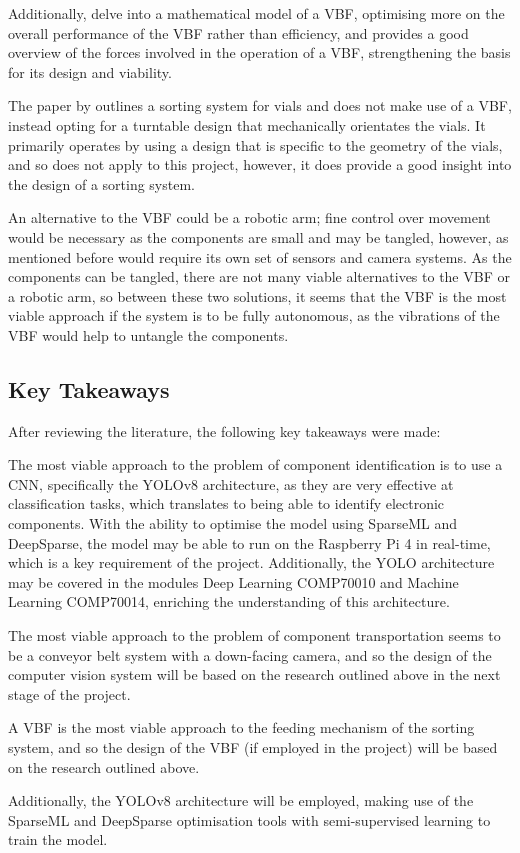Additionally, \citet{REINHART2010191} delve into a mathematical model of a VBF, optimising more on the overall performance of the VBF rather than efficiency, and \citet{ForceAnalysisofVibratoryBowlFeeder}
provides a good overview of the forces involved in the operation of a VBF, strengthening the basis for its design and viability.

The paper by \citet{zhang2019design} outlines a sorting system for vials and does not make use of a VBF, instead opting for a turntable design that mechanically orientates the vials. It primarily operates
by using a design that is specific to the geometry of the vials, and so does not apply to this project, however, it does provide a good insight into the design of a sorting system.

An alternative to the VBF could be a robotic arm; fine control over movement would be necessary as the components are small and may be tangled, however, as mentioned before would require its own set of sensors and camera systems.
As the components can be tangled, there are not many viable alternatives to the VBF or a robotic arm, so between these two solutions, it seems that the VBF is the most viable approach if the system is to be fully autonomous, as the vibrations of the VBF would help to untangle the components.
\subsection{Key Takeaways}
After reviewing the literature, the following key takeaways were made:

The most viable approach to the problem of component identification is to use a CNN, specifically the YOLOv8 architecture, as they are very effective at classification tasks, which translates to being able to identify electronic components. With the ability
to optimise the model using SparseML and DeepSparse, the model may be able to run on the Raspberry Pi 4 in real-time, which is a key requirement of the project.
Additionally, the YOLO architecture may be covered in the modules Deep Learning COMP70010 and Machine Learning COMP70014, enriching the understanding of this architecture.

The most viable approach to the problem of component transportation seems to be a conveyor belt system with a down-facing camera, and so the design of the computer vision system will be based on the research outlined above in the next stage of the project.

A VBF is the most viable approach to the feeding mechanism of the sorting system, and so the design of the VBF (if employed in the project) will be based on the research outlined above.

Additionally, the YOLOv8 architecture will be employed, making use of the SparseML and DeepSparse optimisation tools with semi-supervised learning to train the model.
